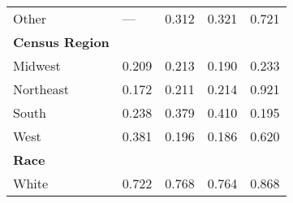 {\begin{tabular}{L{5.5cm} C{3.5cm} C{3.5cm} C{3.5cm} C{4cm}}
                          Other                           &                           ---                            &                          0.312                           &                          0.321                           &                          0.721                            \\
\textbf{Census Region}                                    &                                                          &                                                          &                                                          &                                                           \\
                         Midwest                          &                          0.209                           &                          0.213                           &                          0.190                           &                          0.233                            \\
                        Northeast                         &                          0.172                           &                          0.211                           &                          0.214                           &                          0.921                            \\
                          South                           &                          0.238                           &                          0.379                           &                          0.410                           &                          0.195                            \\
                           West                           &                          0.381                           &                          0.196                           &                          0.186                           &                          0.620                            \\
\textbf{Race}                                             &                                                          &                                                          &                                                          &                                                           \\
                          White                           &                          0.722                           &                          0.768                           &                          0.764                           &                          0.868                            \\

\end{tabular}}
